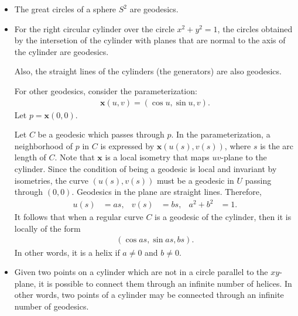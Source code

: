 \documentclass[10pt]{article}
\newcommand{\ve}[1]{\mathbf{#1}}
\begin{document}
\begin{itemize}
    \item The great circles of a sphere $S^2$ are geodesics.

    \item For the right circular cylinder over the circle $x^2 + y^2 = 1$, the circles obtained by the intersetion of the cylinder with planes that are normal to the axis of the cylinder are geodesics.

    Also, the straight lines of the cylinders (the generators) are also geodesics.

    For other geodesics, consider the parameterization:
    \begin{align*}
      \ve{x}(u,v) = ( \cos u, \sin u, v ).
    \end{align*}
    Let $p = \ve{x}(0,0)$. 

    Let $C$ be a geodesic which passes through $p$. In the parameterization, a neighborhood of $p$ in $C$ is expressed by $\ve{x}(u(s), v(s))$, where $s$ is the arc length of $C$. Note that $\ve{x}$ is a local isometry that maps $uv$-plane to the cylinder. Since the condition of being a geodesic is local and invariant by isometries, the curve $(u(s), v(s))$ must be a geodesic in $U$ passing through $(0,0)$. Geodesics in the plane are straight lines. Therefore,
    \begin{align*}
      u(s) &= as, & v(s) &= bs, & a^2 + b^2 &= 1.
    \end{align*}    
    It follows that when a regular curve $C$ is a geodesic of the cylinder, then it is locally of the form
    \begin{align*}
      (\cos as, \sin as, bs).
    \end{align*}
    In other words, it is a helix if $a \neq 0$ and $b \neq 0$.

    \item Given two points on a cylinder which are not in a circle parallel to the $xy$-plane, it is possible to connect them through an infinite number of helices. In other words, two points of a cylinder may be connected through an infinite number of geodesics.


\end{itemize}
\end{document}

